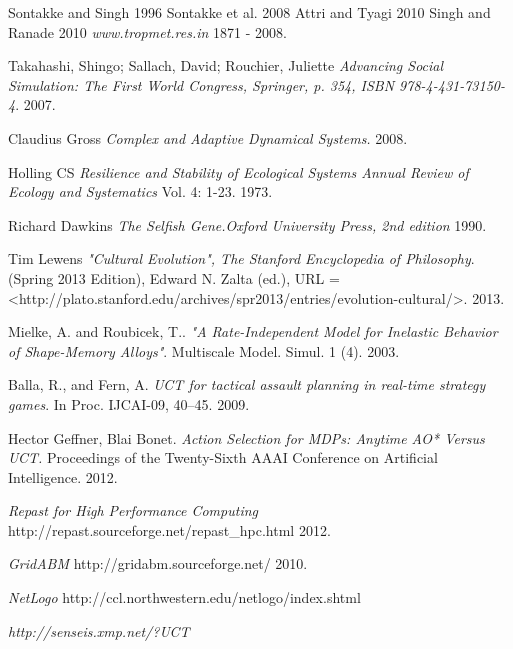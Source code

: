 \documentclass[11pt,oneside,a4paper,openright]{report}
\begin{document}
\begin{thebibliography}{49}
	Sontakke and Singh 1996
	Sontakke et al. 2008
	Attri and Tyagi 2010
	Singh and Ranade 2010
	\emph{www.tropmet.res.in}
	1871 - 2008. 




	Takahashi, Shingo; Sallach, David; Rouchier, Juliette
	\emph{Advancing Social Simulation: The First World Congress, Springer, p. 354, ISBN 978-4-431-73150-4}.
	2007.

	Claudius Gross
	\emph{Complex and Adaptive Dynamical Systems.}
	2008.

	Holling CS 
	\emph{Resilience and Stability of Ecological Systems Annual Review of Ecology and Systematics} Vol. 4: 1-23.
	1973. 

	
	Richard Dawkins
	\emph{The Selfish Gene.Oxford University Press, 2nd edition}	
	1990.

	Tim Lewens
	\emph{"Cultural Evolution", The Stanford Encyclopedia of Philosophy}. 
	(Spring 2013 Edition), Edward N. Zalta (ed.), 
	URL = <http://plato.stanford.edu/archives/spr2013/entries/evolution-cultural/>. 
	2013.

	Mielke, A. and Roubicek, T.. 
	\emph{"A Rate-Independent Model for Inelastic Behavior of Shape-Memory Alloys"}. 
	Multiscale Model. Simul. 1 (4). 
	2003.

	Balla, R., and Fern, A. 
	\emph{UCT for tactical assault planning in real-time strategy games}. In Proc. IJCAI-09, 40–45.
	2009. 

	Hector Geffner, Blai Bonet.
	\emph{Action Selection for MDPs: Anytime AO* Versus UCT.} 
	Proceedings of the Twenty-Sixth AAAI Conference on Artificial Intelligence.	
	2012.

	\emph{Repast for High Performance Computing}
	http://repast.sourceforge.net/repast_hpc.html
	2012.

	\emph{GridABM}
	http://gridabm.sourceforge.net/
	2010.

	\emph{NetLogo}
	http://ccl.northwestern.edu/netlogo/index.shtml


	\emph{http://senseis.xmp.net/?UCT}



\end{thebibliography}
\end{document}
